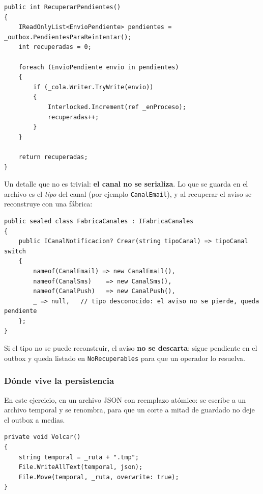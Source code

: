 \begin{lstlisting}[basicstyle=\ttfamily\footnotesize, columns=fullflexible, keepspaces=true, caption={Recuperar lo pendiente y reencolarlo con su contador de intentos.}]
public int RecuperarPendientes()
{
    IReadOnlyList<EnvioPendiente> pendientes = _outbox.PendientesParaReintentar();
    int recuperadas = 0;

    foreach (EnvioPendiente envio in pendientes)
    {
        if (_cola.Writer.TryWrite(envio))
        {
            Interlocked.Increment(ref _enProceso);
            recuperadas++;
        }
    }

    return recuperadas;
}
\end{lstlisting}

Un detalle que no es trivial: \textbf{el canal no se serializa}. Lo que se guarda en el archivo es
el \emph{tipo} del canal (por ejemplo \texttt{CanalEmail}), y al recuperar el aviso se reconstruye
con una fábrica:

\begin{lstlisting}[basicstyle=\ttfamily\footnotesize, columns=fullflexible, keepspaces=true]
public sealed class FabricaCanales : IFabricaCanales
{
    public ICanalNotificacion? Crear(string tipoCanal) => tipoCanal switch
    {
        nameof(CanalEmail) => new CanalEmail(),
        nameof(CanalSms)    => new CanalSms(),
        nameof(CanalPush)   => new CanalPush(),
        _ => null,   // tipo desconocido: el aviso no se pierde, queda pendiente
    };
}
\end{lstlisting}

Si el tipo no se puede reconstruir, el aviso \textbf{no se descarta}: sigue pendiente en el
outbox y queda listado en \texttt{NoRecuperables} para que un operador lo resuelva.

\subsubsection{Dónde vive la persistencia}

En este ejercicio, en un archivo JSON con reemplazo atómico: se escribe a un archivo temporal y
se renombra, para que un corte a mitad de guardado no deje el outbox a medias.

\begin{lstlisting}[basicstyle=\ttfamily\footnotesize, columns=fullflexible, keepspaces=true, caption={La escritura al disco es atómica: temporal y renombrado.}]
private void Volcar()
{
    string temporal = _ruta + ".tmp";
    File.WriteAllText(temporal, json);
    File.Move(temporal, _ruta, overwrite: true);
}
\end{lstlisting}

